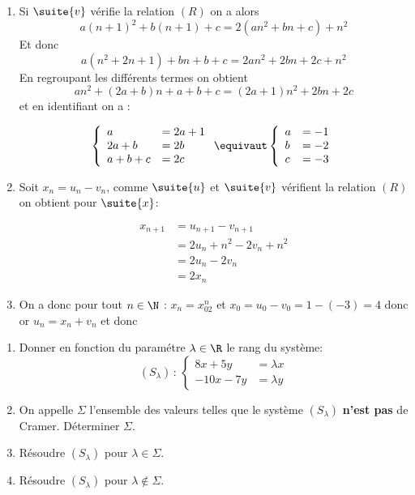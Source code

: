 \documentclass[a4paper, 11pt,reqno]{article}
\begin{document}
\begin{correction}
\begin{enumerate}
\item Si $\suite{v}$ vérifie la relation $(R)$ on a alors 
$$a(n+1)^2 +b(n+1) +c = 2(an^2+bn+c) +n^2$$
Et donc 
$$a(n^2+2n+1) +bn+b+c = 2an^2 +2bn+2c +n^2$$
En regroupant les différents termes on obtient 
$$a n^2 +(2a+b)n +a+b+c = (2a+1)n^2 +2bn +2c$$
et en identifiant on a : 

$$\left\{ \begin{array}{ll}
a&=2a+1\\
2a+b&=2b\\
a+b+c&=2c
\end{array}\right.\equivaut 
\left\{ \begin{array}{ll}
a&=-1\\
b&=-2\\
c&=-3
\end{array}\right.
$$
\item  Soit $x_n= u_n-v_n$, comme $\suite{u} $ et $\suite{v}$ vérifient la relation $(R)$ on obtient pour $\suite{x}$:

\begin{align*}
x_{n+1}  &= u_{n+1}-v_{n+1}\\
			  &= 2u_n+n^2-2v_n+n^2\\
			  			  &= 2u_n-2v_n\\
			  			  &= 2x_n
\end{align*}


\item On a donc pour tout $n\in \N$  : $x_n =x_02^n$ 
et $x_0 = u_0-v_0 =1-(-3)= 4$ donc 
or $u_n=x_n+v_n$ 
et donc


\end{enumerate}

\end{correction}
\vspace{1cm}

\begin{exercice}
\begin{enumerate}
\item Donner en fonction du paramétre $\lambda\in \R$ le rang du système:
$$(S_\lambda) \,:\,\left\{\begin{array}{rl}
8x +5y&=\lambda x\\
-10x-7y&=\lambda y
\end{array}\right.$$
\item On appelle $\Sigma$ l'ensemble des valeurs telles que le système $(S_\lambda)$ \textbf{n'est pas} de Cramer. Déterminer $\Sigma$.
\item Résoudre $(S_\lambda)$ pour $\lambda \in\Sigma$.
\item Résoudre $(S_\lambda)$ pour $\lambda \notin\Sigma$.
\end{enumerate}

\end{exercice}
\end{document}
